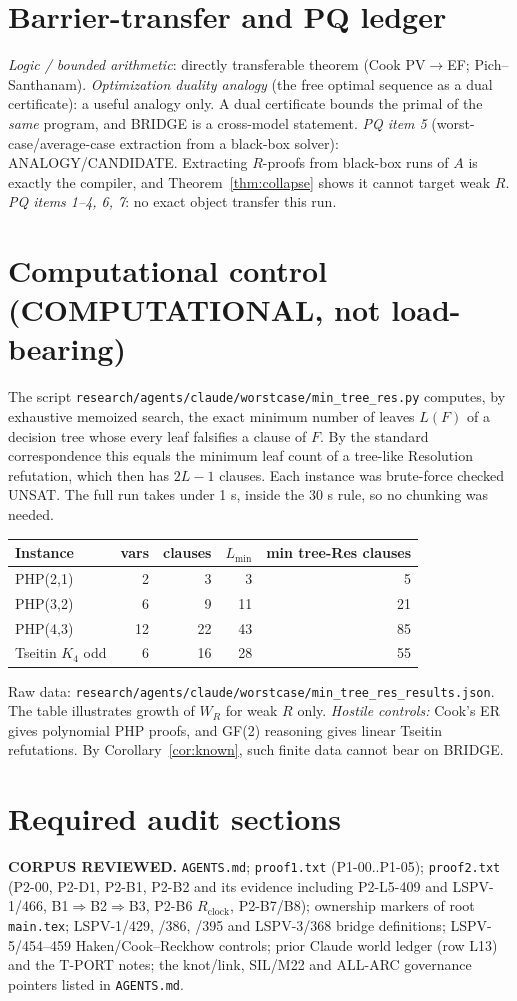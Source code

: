 \documentclass[11pt]{article}
\theoremstyle{definition}\newtheorem{definition}[theorem]{Definition}
\begin{document}
\section{Barrier-transfer and PQ ledger}
\emph{Logic / bounded arithmetic}: directly transferable theorem (Cook PV$\to$EF; Pich--Santhanam). \emph{Optimization duality analogy} (the free optimal sequence as a dual certificate): a useful analogy only. A dual certificate bounds the primal of the \emph{same} program, and BRIDGE is a cross-model statement. \emph{PQ item 5} (worst-case/average-case extraction from a black-box solver): ANALOGY/CANDIDATE. Extracting $R$-proofs from black-box runs of $A$ is exactly the compiler, and Theorem~\ref{thm:collapse} shows it cannot target weak $R$. \emph{PQ items 1--4, 6, 7}: no exact object transfer this run.

\section{Computational control (COMPUTATIONAL, not load-bearing)}
The script \texttt{research/agents/claude/worstcase/min\_tree\_res.py} computes, by exhaustive memoized search, the exact minimum number of leaves $L(F)$ of a decision tree whose every leaf falsifies a clause of $F$. By the standard correspondence this equals the minimum leaf count of a tree-like Resolution refutation, which then has $2L-1$ clauses. Each instance was brute-force checked UNSAT. The full run takes under 1 s, inside the 30 s rule, so no chunking was needed.
\begin{center}\begin{tabular}{lrrrr}
Instance & vars & clauses & $L_{\min}$ & min tree-Res clauses\\\hline
PHP(2,1) & 2 & 3 & 3 & 5\\
PHP(3,2) & 6 & 9 & 11 & 21\\
PHP(4,3) & 12 & 22 & 43 & 85\\
Tseitin $K_4$ odd & 6 & 16 & 28 & 55
\end{tabular}\end{center}
Raw data: \texttt{research/agents/claude/worstcase/min\_tree\_res\_results.json}. The table illustrates growth of $W_R$ for weak $R$ only. \emph{Hostile controls:} Cook's ER gives polynomial PHP proofs, and GF(2) reasoning gives linear Tseitin refutations. By Corollary~\ref{cor:known}, such finite data cannot bear on BRIDGE.

\section{Required audit sections}
\textbf{CORPUS REVIEWED.} \texttt{AGENTS.md}; \texttt{proof1.txt} (P1-00..P1-05); \texttt{proof2.txt} (P2-00, P2-D1, P2-B1, P2-B2 and its evidence including P2-L5-409 and LSPV-1/466, B1$\Rightarrow$B2$\Rightarrow$B3, P2-B6 $R_{\mathrm{clock}}$, P2-B7/B8); ownership markers of root \texttt{main.tex}; LSPV-1/429, /386, /395 and LSPV-3/368 bridge definitions; LSPV-5/454--459 Haken/Cook--Reckhow controls; prior Claude world ledger (row L13) and the T-PORT notes; the knot/link, SIL/M22 and ALL-ARC governance pointers listed in \texttt{AGENTS.md}.
\end{document}
